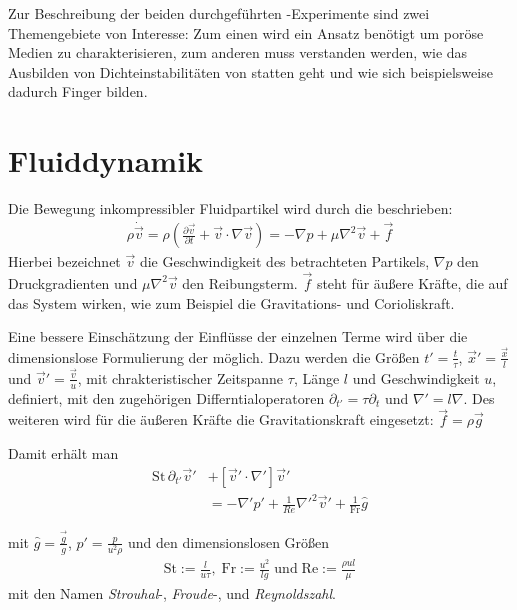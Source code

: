 \label{cha:theo}

Zur Beschreibung der beiden durchgeführten \HSCs-Experimente sind zwei Themengebiete von Interesse: Zum einen wird ein Ansatz benötigt um poröse Medien zu charakterisieren, zum anderen muss verstanden werden, wie das Ausbilden von Dichteinstabilitäten von statten geht und wie sich beispielsweise dadurch Finger bilden.


\section{Fluiddynamik}
\label{sec:hyd}
Die Bewegung inkompressibler Fluidpartikel wird durch die \NSG beschrieben:
\begin{eqnarray}
 \rho \dot{\vec{v}} = \rho \left( \frac{\partial \vec{v}}{\partial t} + \vec{v} \cdot \nabla \vec{v} \right) = - \nabla p + \mu \nabla^2 \vec{v} + \vec{f}
\end{eqnarray}
Hierbei bezeichnet $\vec{v}$ die Geschwindigkeit des betrachteten Partikels, $\nabla p$ den Druckgradienten und $\mu \nabla^2 \vec{v}$ den Reibungsterm. $\vec{f}$ steht für äußere Kräfte, die auf das System wirken, wie zum Beispiel die Gravitations- und Corioliskraft. \citep{roth2005}

Eine bessere Einschätzung der Einflüsse der einzelnen Terme wird über die dimensionslose Formulierung der \NSG möglich. Dazu werden die Größen $t' = \frac{t}{\tau}$,  $\vec{x}' = \frac{\vec{x}}{l}$ und $\vec{v}' = \frac{\vec{v}}{u}$, mit chrakteristischer Zeitspanne $\tau$, Länge $l$ und Geschwindigkeit $u$, definiert, mit den zugehörigen Differntialoperatoren $\partial_{t'} = \tau\partial_t$ und $\nabla' = l\nabla$. 
Des weiteren wird für die äußeren Kräfte die Gravitationskraft eingesetzt: $\vec{f} = \rho\vec{g}$

Damit erhält man
\begin{equation}
\begin{aligned}
 \mathrm{St} \, \partial_{t'} \vec{v}' &+ \left[\vec{v}' \cdot \nabla' \right]\vec{v}' \\
 &= -\nabla'p' + \frac{1}{Re}\nabla'^2\vec{v}' + \frac{1}{\mathrm{Fr}}\hat{g}
\end{aligned}
\end{equation}

mit $\hat{g} = \frac{\vec{g}}{g}$, $p' = \frac{p}{u^2\rho}$ und den dimensionslosen Größen 
\begin{align}
 \mathrm{St} := \frac{l}{u\tau}, \; \mathrm{Fr} := \frac{u^2}{lg} \; \mathrm{und}  \; \mathrm{Re} := \frac{\rho u l}{\mu}
 \label{eq:Re}
\end{align}
 mit den Namen \textit{Strouhal}-, \textit{Froude}-, und \textit{Reynoldszahl}.

